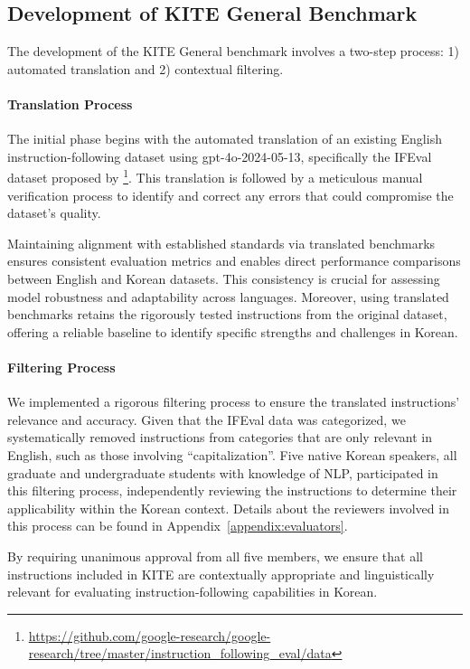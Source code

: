     \subsection{Development of KITE General Benchmark}
    \label{sec:KITE_general}
    The development of the KITE General benchmark involves a two-step process: 1) automated translation and 2) contextual filtering.

    \paragraph{Translation Process}
    The initial phase begins with the automated translation of an existing English instruction-following dataset using gpt-4o-2024-05-13, specifically the IFEval dataset proposed by \cite{zhou2023instruction}\footnote{\url{https://github.com/google-research/google-research/tree/master/instruction_following_eval/data}}. This translation is followed by a meticulous manual verification process to identify and correct any errors that could compromise the dataset's quality.

    Maintaining alignment with established standards via translated benchmarks ensures consistent evaluation metrics and enables direct performance comparisons between English and Korean datasets. This consistency is crucial for assessing model robustness and adaptability across languages. Moreover, using translated benchmarks retains the rigorously tested instructions from the original dataset, offering a reliable baseline to identify specific strengths and challenges in Korean.

    \paragraph{Filtering Process}
    We implemented a rigorous filtering process to ensure the translated instructions' relevance and accuracy. Given that the IFEval data was categorized, we systematically removed instructions from categories that are only relevant in English, such as those involving ``capitalization''. Five native Korean speakers, all graduate and undergraduate students with knowledge of NLP, participated in this filtering process, independently reviewing the instructions to determine their applicability within the Korean context. Details about the reviewers involved in this process can be found in Appendix~\ref{appendix:evaluators}.

    By requiring unanimous approval from all five members, we ensure  that all instructions included in KITE are contextually appropriate and linguistically relevant for evaluating instruction-following capabilities in Korean.

